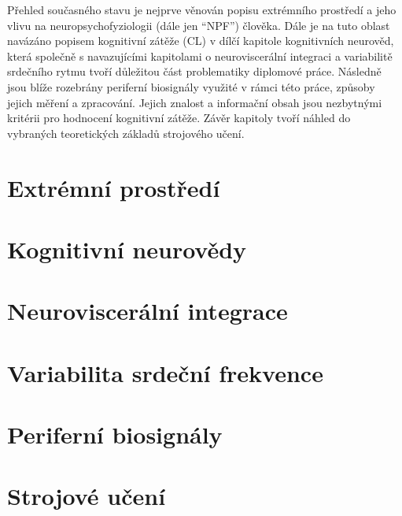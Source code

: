 Přehled současného stavu je nejprve věnován popisu extrémního prostředí a jeho
vlivu na neuropsychofyziologii (dále jen \enquote{\gls{NPF}}) člověka. Dále je
na tuto oblast navázáno popisem kognitivní zátěže (\gls{CL}) v dílčí kapitole
kognitivních neurověd, která společně s navazujícími kapitolami o
neuroviscerální integraci a variabilitě srdečního rytmu tvoří důležitou část
problematiky diplomové práce. Následně jsou blíže rozebrány periferní biosignály
využité v rámci této práce, způsoby jejich měření a zpracování. Jejich znalost a
informační obsah jsou nezbytnými kritérii pro hodnocení kognitivní zátěže. Závěr
kapitoly tvoří náhled do vybraných teoretických základů strojového učení.

\section{Extrémní prostředí}
\label{sec:extreme_environment}


\section{Kognitivní neurovědy}
\label{sec:cognitive_neuroscience}


\section{Neuroviscerální integrace}
\label{sec:neurovisceralni_integrace}


\section{Variabilita srdeční frekvence}
\label{sec:hrv}


\section{Periferní biosignály}
\label{sec:peripheral_biosignals}


\section{Strojové učení}
\label{sec:machine_learning}
